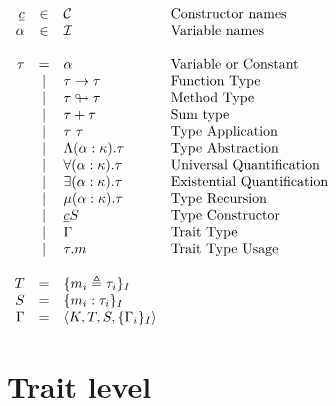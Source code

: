 \documentclass{article}[11pt]
\begin{document}
    \begin{math}
        \begin{array}{rclp{5cm}}
            \underline{c} & \in  & {\cal C}                     & Constructor names          \\
            \alpha        & \in  & {\cal I}                     & Variable names             \\
            \\
            \tau & =
            & \alpha                       & Variable or Constant              \\
            & \mid & \tau \rightarrow \tau        & Function Type              \\
            & \mid & \tau \looparrowright \tau    & Method Type              \\
            & \mid & \tau + \tau                  & Sum type              \\
            & \mid & \tau~\tau                    & Type Application              \\
            & \mid & \Lambda (\alpha:\kappa).\tau & Type Abstraction              \\
            & \mid & \forall (\alpha:\kappa).\tau & Universal Quantification              \\
            & \mid & \exists (\alpha:\kappa).\tau & Existential Quantification              \\
            & \mid & \mu(\alpha:\kappa).\tau      & Type Recursion              \\
            & \mid & \underline{c} S              & Type Constructor              \\
            & \mid & \Gamma                       & Trait Type              \\
            & \mid & \tau . m                     & Trait Type Usage              \\
            \\
            T       & =   & \{ m_i \triangleq \tau_i \}_I     \\
            S       & =   & \{ m_i : \tau_i \}_I              \\
            \Gamma  & =   & \langle K, T, S, \{ \Gamma_i \}_I \rangle        \\
        \end{array}
    \end{math}


    \section{Trait level}\label{sec:trait-level}
\end{document}
